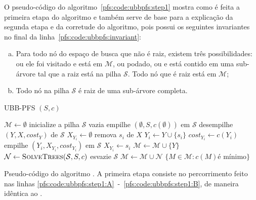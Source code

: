 O pseudo-código do algoritmo~\ref{pfs:code:ubbpfs:step1} mostra como é feita a 
primeira etapa do algoritmo e também serve de base para a explicação da
segunda etapa  e da corretude do algoritmo, pois 
possui os seguintes invariantes no final da linha~\ref{pfs:code:ubbpfs:invariant}:
\begin{enumerate}[a)]
    \item{Para todo nó do espaço de busca que não é raiz, existem três 
        possibilidades: ou ele foi visitado e está em $\mathcal{M}$, ou 
        podado, ou e está contido em uma sub-árvore tal que a raiz está 
        na pilha $\mathcal{S}$. Todo nó que é raiz está em 
        $\mathcal{M}$}; \label{pfs:code:ubb:invariant:A}
    \item{Todo nó na pilha $\mathcal{S}$ é raiz de uma sub-árvore 
        completa.} \label{pfs:code:ubb:invariant:B}
\end{enumerate}

\begin{algorithm}[!ht]
\textsc{UBB-PFS} $(S, c)$
\begin{algorithmic}[1]
    \State $\mathcal{M} \gets \emptyset$
    \State inicialize a pilha $\mathcal{S}$ vazia
    \State empilhe $(\emptyset, S, c(\emptyset))$ em $\mathcal{S}$
     \label{pfs:code:ubbpfs:step1:A}
        \State desempilhe $(Y, X, cost_Y)$ de $\mathcal{S}$
        \State $X_{Y_i} \gets \emptyset$
            \State remova $s_i$ de $X$
            \State $Y_i \gets Y \cup \{s_i\}$
            \State $cost_{Y_i} \gets c (Y_i)$
                \State empilhe $(Y_i, X_{Y_i}, cost_{Y_i})$ em $\mathcal{S}$
            \EndIf
            \State $X_{Y_i} \gets {s_i}$
        \EndWhile
        \State $\mathcal{M} \gets \mathcal{M} \cup \{Y\}$ \label{pfs:code:ubbpfs:invariant}
            \State $\mathcal{N} \gets {\normalfont\textsc{SolveTrees}} (\mathcal{S}, S, c)$
            \State esvazie $\mathcal{S}$
        \EndIf
    \EndWhile \label{pfs:code:ubbpfs:step1:B}
    \State $\mathcal{M} \gets \mathcal{M} \cup \mathcal{N}$
    \Return $\{M \in \mathcal{M} : c(M) \text{é mínimo}\}$
\end{algorithmic}
\caption{Pseudo-código do algoritmo . A primeira etapa 
consiste no percorrimento feito nas linhas 
\ref{pfs:code:ubbpfs:step1:A}~-~\ref{pfs:code:ubbpfs:step1:B}, de 
maneira idêntica ao .}
\label{pfs:code:ubbpfs:step1}
\end{algorithm}


